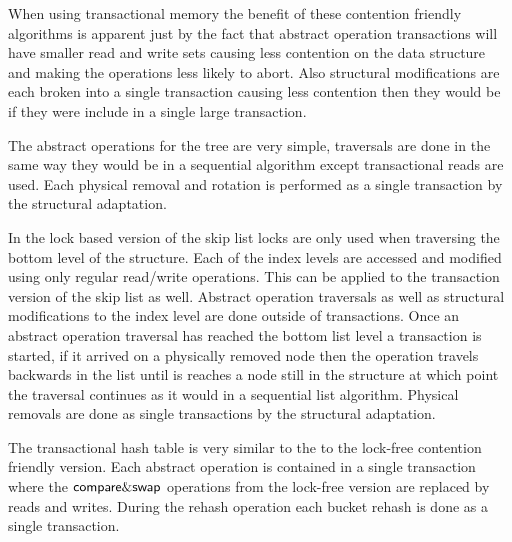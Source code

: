 When using transactional memory the benefit of these contention friendly algorithms is apparent just
by the fact that abstract operation transactions will have smaller read and write sets causing less contention
on the data structure and making the operations less likely to abort.
Also structural modifications are each broken into a single transaction causing less contention then they would
be if they were include in a single large transaction.

The abstract operations for the tree are very simple, traversals are done in the same way they would be in a
sequential algorithm except transactional reads are used.
Each physical removal and rotation is performed as a single transaction by the structural adaptation.

In the lock based version of the skip list locks are only used when traversing the bottom level of
the structure.
Each of the index levels are accessed and modified using only regular read/write operations.
This can be applied to the transaction version of the skip list as well.
Abstract operation traversals as well as structural modifications to the index level are done outside of transactions.
Once an abstract operation traversal has reached the bottom list level a transaction is started, if it arrived on
a physically removed node then the operation travels backwards in the list until is reaches a node still in the structure
at which point the traversal continues as it would in a sequential list algorithm.
Physical removals are done as single transactions by the structural adaptation.

The transactional hash table is very similar to the to the lock-free contention friendly version.
Each abstract operation is contained in a single transaction where the $\lit{compare\&swap}$
operations from the lock-free version are replaced by reads and writes.
During the rehash operation each bucket rehash is done as a single transaction.



